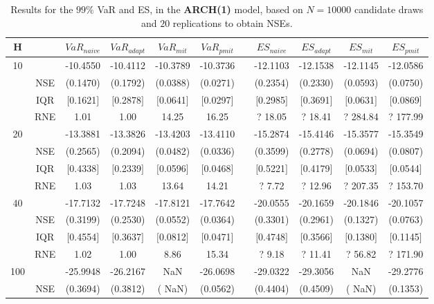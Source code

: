 \footnotesize{  
{ \renewcommand{\arraystretch}{1.3} 
\begin{longtable}{ccccccccccc}  
\caption{Results for the $99\%$ VaR and ES, in the \textbf{ARCH(1)} model, based on $N=10000$ candidate draws and $20$ replications to obtain NSEs.} 
\label{tab:res_algos_arch} \\ 
 H & & $VaR_{naive}$ & $VaR_{adapt}$ & $VaR_{mit}$  & $VaR_{pmit}$ &  & $ES_{naive}$ & $ES_{adapt}$ & $ES_{mit}$ & $ES_{pmit}$ \\ \hline 
10 & & -10.4550 & -10.4112 & -10.3789 & -10.3736 & & -12.1103 & -12.1538 & -12.1145 & -12.0586  \\ 
  & NSE & (0.1470) & (0.1792) & (0.0388) & (0.0271) & & (0.2354) & (0.2330) & (0.0593) & (0.0750)   \\ 
 & IQR & $[$0.1621$]$ & $[$0.2878$]$ & $[$0.0641$]$ & $[$0.0297$]$ & & $[$0.2985$]$ & $[$0.3691$]$  &$[$0.0631$]$ & $[$0.0869$]$  \\  
  & RNE &   1.01 &   1.00 &  14.25 &  16.25 &  &?  18.05 & ?  18.41 &  ? 284.84 & ? 177.99   \\ [1ex] 
20 & & -13.3881 & -13.3826 & -13.4203 & -13.4110 & & -15.2874 & -15.4146 & -15.3577 & -15.3549  \\ 
  & NSE & (0.2565) & (0.2094) & (0.0482) & (0.0336) & & (0.3599) & (0.2778) & (0.0694) & (0.0807)   \\ 
 & IQR & $[$0.4338$]$ & $[$0.2339$]$ & $[$0.0596$]$ & $[$0.0468$]$ & & $[$0.5221$]$ & $[$0.4179$]$  &$[$0.0533$]$ & $[$0.0544$]$  \\  
  & RNE &   1.03 &   1.03 &  13.64 &  14.21 &  &?   7.72 & ?  12.96 &  ? 207.35 & ? 153.70   \\ [1ex] 
40 & & -17.7132 & -17.7248 & -17.8121 & -17.7642 & & -20.0555 & -20.1659 & -20.1846 & -20.1057  \\ 
  & NSE & (0.3199) & (0.2530) & (0.0552) & (0.0364) & & (0.3301) & (0.2961) & (0.1327) & (0.0763)   \\ 
 & IQR & $[$0.4554$]$ & $[$0.3637$]$ & $[$0.0812$]$ & $[$0.0471$]$ & & $[$0.4748$]$ & $[$0.3566$]$  &$[$0.1380$]$ & $[$0.1145$]$  \\  
  & RNE &   1.02 &   1.00 &   8.86 &  15.34 &  &?   9.18 & ?  11.41 &  ?  56.82 & ? 171.90   \\ [1ex] 
100 & & -25.9948 & -26.2167 &    NaN & -26.0698 & & -29.0322 & -29.3056 &    NaN & -29.2776  \\ 
  & NSE & (0.3694) & (0.3812) & (   NaN) & (0.0562) & & (0.4404) & (0.4509) & (   NaN) & (0.1353)   \\ 

\end{longtable}}}
